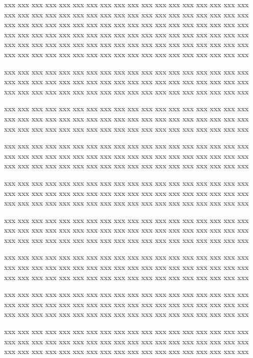 \documentclass[10pt,twoside%
	]{article}
\begin{document}
\begin{discussion}
xxx xxx xxx xxx xxx xxx xxx xxx xxx xxx xxx xxx xxx xxx xxx xxx xxx xxx 
xxx xxx xxx xxx xxx xxx xxx xxx xxx xxx xxx xxx xxx xxx xxx xxx xxx xxx 
xxx xxx xxx xxx xxx xxx xxx xxx xxx xxx xxx xxx xxx xxx xxx xxx xxx xxx 
xxx xxx xxx xxx xxx xxx xxx xxx xxx xxx xxx xxx xxx xxx xxx xxx xxx xxx 
xxx xxx xxx xxx xxx xxx xxx xxx xxx xxx xxx xxx xxx xxx xxx xxx xxx xxx 
xxx xxx xxx xxx xxx xxx xxx xxx xxx xxx xxx xxx xxx xxx xxx xxx xxx xxx 

\end{discussion}





%
xxx xxx xxx xxx xxx xxx xxx xxx xxx xxx xxx xxx xxx xxx xxx xxx xxx xxx 
xxx xxx xxx xxx xxx xxx xxx xxx xxx xxx xxx xxx xxx xxx xxx xxx xxx xxx 
xxx xxx xxx xxx xxx xxx xxx xxx xxx xxx xxx xxx xxx xxx xxx xxx xxx xxx 

xxx xxx xxx xxx xxx xxx xxx xxx xxx xxx xxx xxx xxx xxx xxx xxx xxx xxx 
xxx xxx xxx xxx xxx xxx xxx xxx xxx xxx xxx xxx xxx xxx xxx xxx xxx xxx 
xxx xxx xxx xxx xxx xxx xxx xxx xxx xxx xxx xxx xxx xxx xxx xxx xxx xxx 

xxx xxx xxx xxx xxx xxx xxx xxx xxx xxx xxx xxx xxx xxx xxx xxx xxx xxx 
xxx xxx xxx xxx xxx xxx xxx xxx xxx xxx xxx xxx xxx xxx xxx xxx xxx xxx 
xxx xxx xxx xxx xxx xxx xxx xxx xxx xxx xxx xxx xxx xxx xxx xxx xxx xxx 

xxx xxx xxx xxx xxx xxx xxx xxx xxx xxx xxx xxx xxx xxx xxx xxx xxx xxx 
xxx xxx xxx xxx xxx xxx xxx xxx xxx xxx xxx xxx xxx xxx xxx xxx xxx xxx 
xxx xxx xxx xxx xxx xxx xxx xxx xxx xxx xxx xxx xxx xxx xxx xxx xxx xxx 

xxx xxx xxx xxx xxx xxx xxx xxx xxx xxx xxx xxx xxx xxx xxx xxx xxx xxx 
xxx xxx xxx xxx xxx xxx xxx xxx xxx xxx xxx xxx xxx xxx xxx xxx xxx xxx 
xxx xxx xxx xxx xxx xxx xxx xxx xxx xxx xxx xxx xxx xxx xxx xxx xxx xxx 

xxx xxx xxx xxx xxx xxx xxx xxx xxx xxx xxx xxx xxx xxx xxx xxx xxx xxx 
xxx xxx xxx xxx xxx xxx xxx xxx xxx xxx xxx xxx xxx xxx xxx xxx xxx xxx 
xxx xxx xxx xxx xxx xxx xxx xxx xxx xxx xxx xxx xxx xxx xxx xxx xxx xxx 

xxx xxx xxx xxx xxx xxx xxx xxx xxx xxx xxx xxx xxx xxx xxx xxx xxx xxx 
xxx xxx xxx xxx xxx xxx xxx xxx xxx xxx xxx xxx xxx xxx xxx xxx xxx xxx 
xxx xxx xxx xxx xxx xxx xxx xxx xxx xxx xxx xxx xxx xxx xxx xxx xxx xxx 

xxx xxx xxx xxx xxx xxx xxx xxx xxx xxx xxx xxx xxx xxx xxx xxx xxx xxx 
xxx xxx xxx xxx xxx xxx xxx xxx xxx xxx xxx xxx xxx xxx xxx xxx xxx xxx 
xxx xxx xxx xxx xxx xxx xxx xxx xxx xxx xxx xxx xxx xxx xxx xxx xxx xxx 
\end{document}
